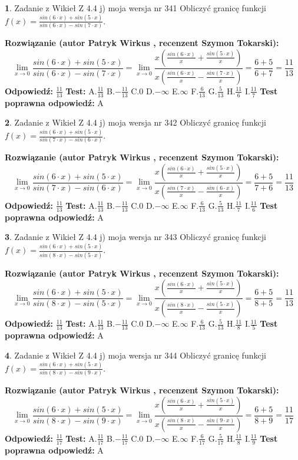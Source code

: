 \documentclass[12pt, a4paper]{article}
\theoremstyle{definition} %
\newtheorem{zad}{}
\newcommand{\zadStart}[1]{\begin{zad}#1\newline}
\newcommand{\zadStop}{\end{zad}}
\newcommand{\rozwStart}[2]{\noindent \textbf{Rozwiązanie (autor #1 , recenzent #2): }\newline}
\newcommand{\rozwStop}{\newline}
\newcommand{\odpStart}{\noindent \textbf{Odpowiedź:}\newline}
\newcommand{\odpStop}{\newline}
\newcommand{\testStart}{\noindent \textbf{Test:}\newline}
\newcommand{\testStop}{\newline}
\newcommand{\kluczStart}{\noindent \textbf{Test poprawna odpowiedź:}\newline}
\newcommand{\kluczStop}{\newline}
\begin{document}
\zadStart{Zadanie z Wikieł Z 4.4 j) moja wersja nr 341}
Obliczyć granicę funkcji $f(x)=\frac{sin(6\cdot x) +sin(5\cdot x)}{sin(6\cdot x) -sin(7\cdot x)}$.
\zadStop
\rozwStart{Patryk Wirkus}{Szymon Tokarski}
$$\lim\limits_{x\to 0}\frac{sin(6\cdot x) +sin(5\cdot x)}{sin(6\cdot x) -sin(7\cdot x)}=\lim\limits_{x\to 0}\frac{x(\frac{sin(6\cdot x)}{x}+\frac{sin(5\cdot x)}{x})}{x(\frac{sin(6\cdot x)}{x}-\frac{sin(7\cdot x)}{x})}=\frac{6+5}{6+7} = \frac{11}{13}$$
\rozwStop
\odpStart
$\frac{11}{13}$
\odpStop
\testStart
A.$\frac{11}{13}$
B.$-\frac{11}{13}$
C.$0$
D.$-\infty$
E.$\infty$
F.$\frac{6}{13}$
G.$\frac{5}{13}$
H.$\frac{11}{6}$
I.$\frac{11}{7}$
\testStop
\kluczStart
A
\kluczStop



\zadStart{Zadanie z Wikieł Z 4.4 j) moja wersja nr 342}
Obliczyć granicę funkcji $f(x)=\frac{sin(6\cdot x) +sin(5\cdot x)}{sin(7\cdot x) -sin(6\cdot x)}$.
\zadStop
\rozwStart{Patryk Wirkus}{Szymon Tokarski}
$$\lim\limits_{x\to 0}\frac{sin(6\cdot x) +sin(5\cdot x)}{sin(7\cdot x) -sin(6\cdot x)}=\lim\limits_{x\to 0}\frac{x(\frac{sin(6\cdot x)}{x}+\frac{sin(5\cdot x)}{x})}{x(\frac{sin(7\cdot x)}{x}-\frac{sin(6\cdot x)}{x})}=\frac{6+5}{7+6} = \frac{11}{13}$$
\rozwStop
\odpStart
$\frac{11}{13}$
\odpStop
\testStart
A.$\frac{11}{13}$
B.$-\frac{11}{13}$
C.$0$
D.$-\infty$
E.$\infty$
F.$\frac{6}{13}$
G.$\frac{5}{13}$
H.$\frac{11}{7}$
I.$\frac{11}{6}$
\testStop
\kluczStart
A
\kluczStop



\zadStart{Zadanie z Wikieł Z 4.4 j) moja wersja nr 343}
Obliczyć granicę funkcji $f(x)=\frac{sin(6\cdot x) +sin(5\cdot x)}{sin(8\cdot x) -sin(5\cdot x)}$.
\zadStop
\rozwStart{Patryk Wirkus}{Szymon Tokarski}
$$\lim\limits_{x\to 0}\frac{sin(6\cdot x) +sin(5\cdot x)}{sin(8\cdot x) -sin(5\cdot x)}=\lim\limits_{x\to 0}\frac{x(\frac{sin(6\cdot x)}{x}+\frac{sin(5\cdot x)}{x})}{x(\frac{sin(8\cdot x)}{x}-\frac{sin(5\cdot x)}{x})}=\frac{6+5}{8+5} = \frac{11}{13}$$
\rozwStop
\odpStart
$\frac{11}{13}$
\odpStop
\testStart
A.$\frac{11}{13}$
B.$-\frac{11}{13}$
C.$0$
D.$-\infty$
E.$\infty$
F.$\frac{6}{13}$
G.$\frac{5}{13}$
H.$\frac{11}{8}$
I.$\frac{11}{5}$
\testStop
\kluczStart
A
\kluczStop



\zadStart{Zadanie z Wikieł Z 4.4 j) moja wersja nr 344}
Obliczyć granicę funkcji $f(x)=\frac{sin(6\cdot x) +sin(5\cdot x)}{sin(8\cdot x) -sin(9\cdot x)}$.
\zadStop
\rozwStart{Patryk Wirkus}{Szymon Tokarski}
$$\lim\limits_{x\to 0}\frac{sin(6\cdot x) +sin(5\cdot x)}{sin(8\cdot x) -sin(9\cdot x)}=\lim\limits_{x\to 0}\frac{x(\frac{sin(6\cdot x)}{x}+\frac{sin(5\cdot x)}{x})}{x(\frac{sin(8\cdot x)}{x}-\frac{sin(9\cdot x)}{x})}=\frac{6+5}{8+9} = \frac{11}{17}$$
\rozwStop
\odpStart
$\frac{11}{17}$
\odpStop
\testStart
A.$\frac{11}{17}$
B.$-\frac{11}{17}$
C.$0$
D.$-\infty$
E.$\infty$
F.$\frac{6}{17}$
G.$\frac{5}{17}$
H.$\frac{11}{8}$
I.$\frac{11}{9}$
\testStop
\kluczStart
A
\kluczStop
\end{document}
